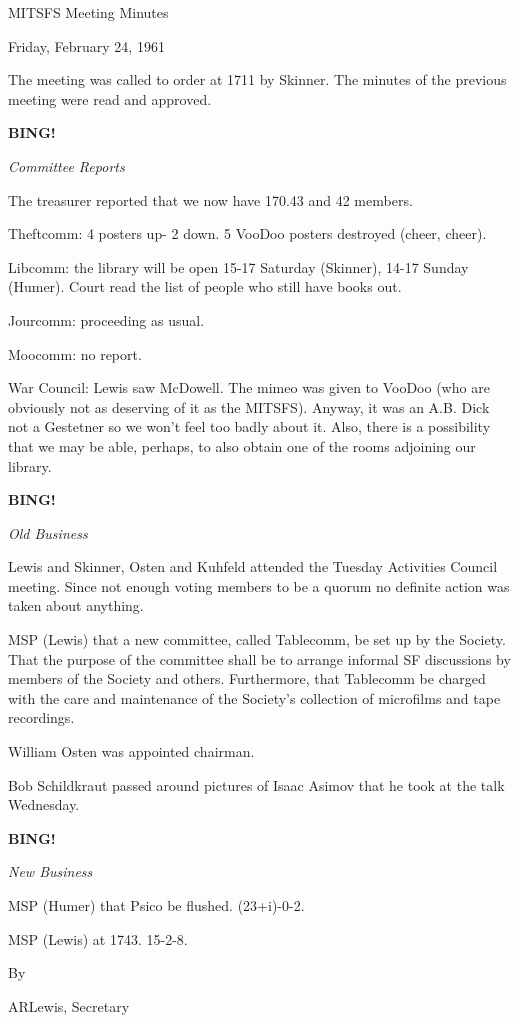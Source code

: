 \documentclass[12pt]{article}
\newcommand{\bing}{{\bf BING!} }
\newcommand{\goto}[1]{\bing \vskip 12pt \centerline{{\em{#1}}}}
\begin{document}
\begin{center}

MITSFS Meeting Minutes

Friday, February 24, 1961

\end{center}
 
\vspace{12pt}

\setlength{\parskip}{6pt}

\noindent
The meeting was called to order at 1711 by Skinner. The minutes of the previous meeting were read and approved.

\goto{Committee Reports}

The treasurer reported that we now have 170.43 and 42 members.

Theftcomm: 4 posters up- 2 down. 5 VooDoo posters destroyed (cheer, cheer).

Libcomm: the library will be open 15-17 Saturday (Skinner), 14-17 Sunday (Humer). Court read the list of people who still have books out.

Jourcomm: proceeding as usual.

Moocomm: no report.

War Council: Lewis saw McDowell. The mimeo was given to VooDoo (who are obviously not as deserving of it as the MITSFS). Anyway, it was an A.B. Dick not a Gestetner so we won't feel too badly about it. Also, there is a possibility that we may be able, perhaps, to also obtain one of the rooms adjoining our library.

\goto{Old Business}

Lewis and Skinner, Osten and Kuhfeld attended the Tuesday Activities Council meeting. Since not enough voting members to be a quorum no definite action was taken about anything.

MSP (Lewis) that a new committee, called Tablecomm, be set up by the Society. That the purpose of the committee shall be to arrange informal SF discussions by members of the Society and others. Furthermore, that Tablecomm be charged with the care and maintenance of the Society's collection of microfilms and tape recordings.

William Osten was appointed chairman.

Bob Schildkraut passed around pictures of Isaac Asimov that he took at the talk Wednesday.

\goto{New Business}

MSP (Humer) that Psico be flushed. (23+i)-0-2.

MSP (Lewis) at 1743. 15-2-8.

\vspace{12pt}

\centerline{By}
\centerline{ARLewis, Secretary}
\end{document}
